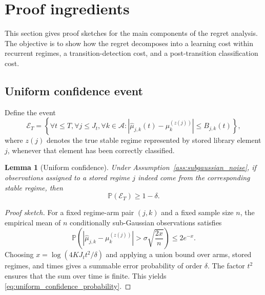 \documentclass[11pt]{article}
\newtheorem{lemma}{Lemma}
\newcommand{\A}{\mathcal A}
\newcommand{\Pp}{\mathbb P}
\newcommand{\abs}[1]{\left\lvert #1 \right\rvert}
\begin{document}
\section{Proof ingredients}
\label{sec:proof_ingredients}

This section gives proof sketches for the main components of the regret analysis. The objective is to show how the regret decomposes into a learning cost within recurrent regimes, a transition-detection cost, and a post-transition classification cost.

\subsection{Uniform confidence event}
\label{subsec:uniform_confidence_event}

Define the event
\begin{equation}
\label{eq:confidence_event}
\mathcal E_T
=
\left\{
\forall t\leq T,
\forall j\leq J_t,
\forall k\in\A:
\abs{\widehat\mu_{j,k}(t)-\mu_k^{(z(j))}}
\leq
B_{j,k}(t)
\right\},
\end{equation}
where $z(j)$ denotes the true stable regime represented by stored library element $j$, whenever that element has been correctly classified.

\begin{lemma}[Uniform confidence]
\label{lem:uniform_confidence}
Under Assumption~\ref{ass:subgaussian_noise}, if observations assigned to a stored regime $j$ indeed come from the corresponding stable regime, then
\begin{equation}
\label{eq:uniform_confidence_probability}
\Pp(\mathcal E_T)
\geq
1-\delta.
\end{equation}
\end{lemma}

\begin{proof}[Proof sketch]
For a fixed regime-arm pair $(j,k)$ and a fixed sample size $n$, the empirical mean of $n$ conditionally sub-Gaussian observations satisfies
\begin{equation}
\label{eq:subgaussian_mean_tail}
\Pp\left(
\abs{\widehat\mu_{j,k}-\mu_k^{(z(j))}}
>
\sigma\sqrt{\frac{2x}{n}}
\right)
\leq
2e^{-x}.
\end{equation}
Choosing $x=\log(4KJ_t t^2/\delta)$ and applying a union bound over arms, stored regimes, and times gives a summable error probability of order $\delta$. The factor $t^2$ ensures that the sum over time is finite. This yields \eqref{eq:uniform_confidence_probability}.
\end{proof}
\end{document}

